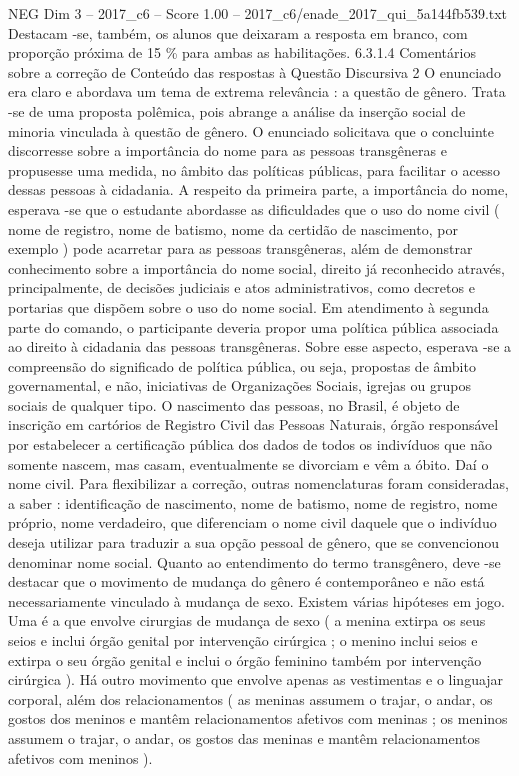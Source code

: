 \begin{textsample}{NEG Dim 3 – 2017\_c6 – Score 1.00 – 2017\_c6/enade\_2017\_qui\_5a144fb539.txt}
Destacam -se, também, os alunos que deixaram a resposta em branco, com proporção próxima de 15 \% para ambas as habilitações. 6.3.1.4 Comentários sobre a correção de Conteúdo das respostas à Questão Discursiva 2 O enunciado era claro e abordava um tema de extrema relevância : a questão de gênero.
Trata -se de uma proposta polêmica, pois abrange a análise da inserção social de minoria vinculada à questão de gênero.
O enunciado solicitava que o concluinte discorresse sobre a importância do nome para as pessoas transgêneras e propusesse uma medida, no âmbito das políticas públicas, para facilitar o acesso dessas pessoas à cidadania.
A respeito da primeira parte, a importância do nome, esperava -se que o estudante abordasse as dificuldades que o uso do nome civil ( nome de registro, nome de batismo, nome da certidão de nascimento, por exemplo ) pode acarretar para as pessoas transgêneras, além de demonstrar conhecimento sobre a importância do nome social, direito já reconhecido através, principalmente, de decisões judiciais e atos administrativos, como decretos e portarias que dispõem sobre o uso do nome social.
Em atendimento à segunda parte do comando, o participante deveria propor uma política pública associada ao direito à cidadania das pessoas transgêneras.
Sobre esse aspecto, esperava -se a compreensão do significado de política pública, ou seja, propostas de âmbito governamental, e não, iniciativas de Organizações Sociais, igrejas ou grupos sociais de qualquer tipo.
O nascimento das pessoas, no Brasil, é objeto de inscrição em cartórios de Registro Civil das Pessoas Naturais, órgão responsável por estabelecer a certificação pública dos dados de todos os indivíduos que não somente nascem, mas casam, eventualmente se divorciam e vêm a óbito.
Daí o nome civil.
Para flexibilizar a correção, outras nomenclaturas foram consideradas, a saber : identificação de nascimento, nome de batismo, nome de registro, nome próprio, nome verdadeiro, que diferenciam o nome civil daquele que o indivíduo deseja utilizar para traduzir a sua opção pessoal de gênero, que se convencionou denominar nome social.
Quanto ao entendimento do termo transgênero, deve -se destacar que o movimento de mudança do gênero é contemporâneo e não está necessariamente vinculado à mudança de sexo.
Existem várias hipóteses em jogo.
Uma é a que envolve cirurgias de mudança de sexo ( a menina extirpa os seus seios e inclui órgão genital por intervenção cirúrgica ; o menino inclui seios e extirpa o seu órgão genital e inclui o órgão feminino também por intervenção cirúrgica ).
Há outro movimento que envolve apenas as vestimentas e o linguajar corporal, além dos relacionamentos ( as meninas assumem o trajar, o andar, os gostos dos meninos e mantêm relacionamentos afetivos com meninas ; os meninos assumem o trajar, o andar, os gostos das meninas e mantêm relacionamentos afetivos com meninos ).

\end{textsample}
